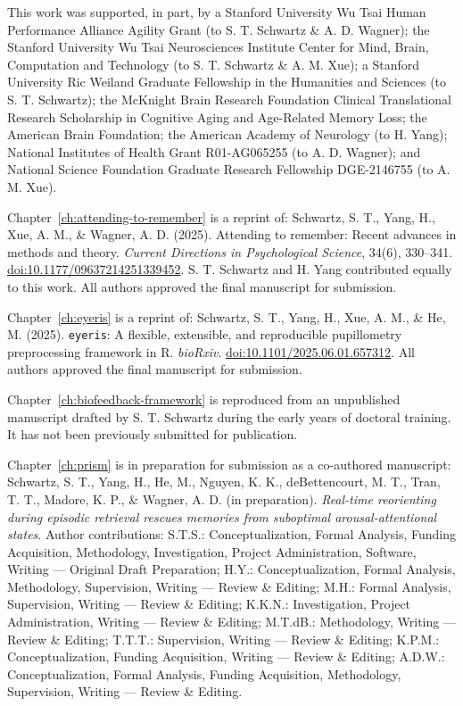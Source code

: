 \noindent This work was supported, in part, by a Stanford University Wu Tsai Human Performance Alliance Agility Grant (to S. T. Schwartz \& A. D. Wagner); the Stanford University Wu Tsai Neurosciences Institute Center for Mind, Brain, Computation and Technology (to S. T. Schwartz \& A. M. Xue); a Stanford University Ric Weiland Graduate Fellowship in the Humanities and Sciences (to S. T. Schwartz); the McKnight Brain Research Foundation Clinical Translational Research Scholarship in Cognitive Aging and Age-Related Memory Loss; the American Brain Foundation; the American Academy of Neurology (to H. Yang); National Institutes of Health Grant R01-AG065255 (to A. D. Wagner); and National Science Foundation Graduate Research Fellowship DGE-2146755 (to A. M. Xue).

\bigskip

\noindent Chapter~\ref{ch:attending-to-remember} is a reprint of: Schwartz, S. T., Yang, H., Xue, A. M., \& Wagner, A. D. (2025). Attending to remember: Recent advances in methods and theory. \textit{Current Directions in Psychological Science}, 34(6), 330--341. \href{https://doi.org/10.1177/09637214251339452}{doi:10.1177/09637214251339452}. S. T. Schwartz and H. Yang contributed equally to this work. All authors approved the final manuscript for submission.

\noindent Chapter~\ref{ch:eyeris} is a reprint of: Schwartz, S. T., Yang, H., Xue, A. M., \& He, M. (2025). \texttt{eyeris}: A flexible, extensible, and reproducible pupillometry preprocessing framework in {R}. \textit{bioRxiv}. \href{https://doi.org/10.1101/2025.06.01.657312}{doi:10.1101/2025.06.01.657312}. All authors approved the final manuscript for submission.

\noindent Chapter~\ref{ch:biofeedback-framework} is reproduced from an unpublished manuscript drafted by S. T. Schwartz during the early years of doctoral training. It has not been previously submitted for publication.

\noindent Chapter~\ref{ch:prism} is in preparation for submission as a co-authored manuscript: Schwartz, S. T., Yang, H., He, M., Nguyen, K. K., deBettencourt, M. T., Tran, T. T., Madore, K. P., \& Wagner, A. D. (in preparation). \textit{Real-time reorienting during episodic retrieval rescues memories from suboptimal arousal-attentional states}. Author contributions: S.T.S.: Conceptualization, Formal Analysis, Funding Acquisition, Methodology, Investigation, Project Administration, Software, Writing --- Original Draft Preparation; H.Y.: Conceptualization, Formal Analysis, Methodology, Supervision, Writing --- Review \& Editing; M.H.: Formal Analysis, Supervision, Writing --- Review \& Editing; K.K.N.: Investigation, Project Administration, Writing --- Review \& Editing; M.T.dB.: Methodology, Writing --- Review \& Editing; T.T.T.: Supervision, Writing --- Review \& Editing; K.P.M.: Conceptualization, Funding Acquisition, Writing --- Review \& Editing; A.D.W.: Conceptualization, Formal Analysis, Funding Acquisition, Methodology, Supervision, Writing --- Review \& Editing.
